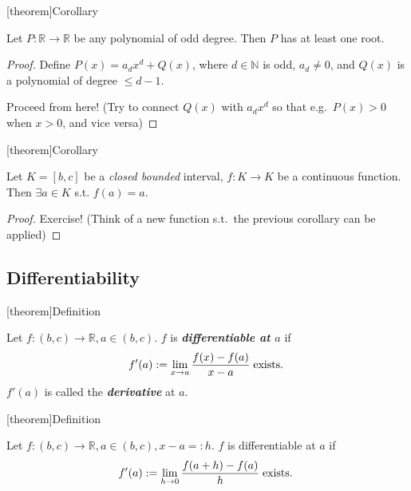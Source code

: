 \documentclass[12pt]{report}
\theoremstyle{definition}
\begin{document}
[theorem]{Corollary}
\begin{odd degree polynomial has at least one root}
    Let $P:\mathbb{R}\rightarrow{}\mathbb{R}$ be any polynomial of odd degree.
    Then $P$ has at least one root.
\end{odd degree polynomial has at least one root}

\begin{proof}
    Define $P(x) = a_d x^{d} + Q(x)$, where $d \in \mathbb{N}$ is odd, $a_d\neq 0$,
    and $Q(x)$ is a polynomial of degree $\le d - 1$. 

    Proceed from here!
    (Try to connect $Q(x)$ with $a_d x^{d}$ so that e.g.\ $P(x) > 0$ when $x > 0$, and vice versa)
\end{proof}

[theorem]{Corollary}
\begin{closed bounded continuous function has a fixed point}
    Let $K = [b,c]$ be a \emph{closed bounded} interval,
    $f:K\rightarrow{}K$ be a continuous function.
    Then $\exists a \in K$ s.t. $f(a) = a$.
\end{closed bounded continuous function has a fixed point}

\begin{proof}
    Exercise! (Think of a new function s.t.\ the previous corollary can be applied)
\end{proof}

\subsection{Differentiability}

[theorem]{Definition}
\begin{differentiable}
    Let $f:(b,c) \rightarrow{} \mathbb{R}, a \in (b,c)$.
    $f$ is \textbf{\emph{differentiable at $a$}} if\[
        f'(a) := \lim_{x\rightarrow{}a} \frac{f(x) - f(a)}{x - a} \;\textnormal{exists.}\;
    \]$f'(a)$ is called the \textbf{\emph{derivative}} at $a$.
\end{differentiable}

[theorem]{Definition}
\begin{differentiable alternative def}
    Let $f:(b,c) \rightarrow{} \mathbb{R}, a \in (b,c), x - a =: h$.
    $f$ is differentiable at $a$ if\[
        f'(a) := \lim_{h\rightarrow{}0} \frac{f(a + h) - f(a)}{h} \;\textnormal{exists.}\;
    \]
\end{differentiable alternative def}
\end{document}
